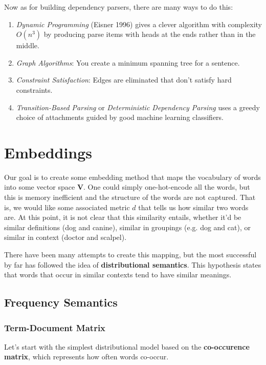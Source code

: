 \documentclass{article}
\begin{document}
      Now as for building dependency parsers, there are many ways to do this: 
      \begin{enumerate}
        \item \textit{Dynamic Programming} (Eisner 1996) gives a clever algorithm with complexity $O(n^3)$ by producing parse items with heads at the ends rather than in the middle. 
        \item \textit{Graph Algorithms}: You create a minimum spanning tree for a sentence. 
        \item \textit{Constraint Satisfaction}: Edges are eliminated that don't satisfy hard constraints. 
        \item \textit{Transition-Based Parsing} or \textit{Deterministic Dependency Parsing} uses a greedy choice of attachments guided by good machine learning classifiers. 
      \end{enumerate}

\section{Embeddings}

    Our goal is to create some embedding method that maps the vocabulary of words into some vector space $\mathbf{V}$. One could simply one-hot-encode all the words, but this is memory inefficient and the structure of the words are not captured. That is, we would like some associated metric $d$ that tells us how similar two words are. At this point, it is not clear that this similarity entails, whether it'd be similar definitions (dog and canine), similar in groupings (e.g. dog and cat), or similar in context (doctor and scalpel). 

    There have been many attempts to create this mapping, but the most successful by far has followed the idea of \textbf{distributional semantics}. This hypothesis states that words that occur in similar contexts tend to have similar meanings. 

  \subsection{Frequency Semantics}

    \subsubsection{Term-Document Matrix}

      Let's start with the simplest distributional model based on the \textbf{co-occurence matrix}, which represents how often words co-occur. 
\end{document}
